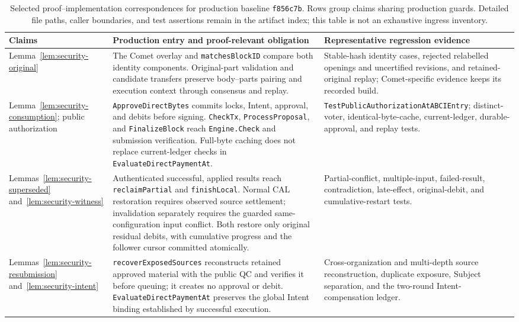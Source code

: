 \begin{table}[t]
\centering
\caption{Selected proof--implementation correspondences for production
baseline \texttt{f856c7b}. Rows group claims sharing production guards.
Detailed file paths, caller boundaries, and test assertions remain in
the artifact index; this table is not an exhaustive ingress inventory.}
\label{tab:proof-implementation}
\small
\setlength{\tabcolsep}{3pt}
\renewcommand{\arraystretch}{1.08}
\begin{tabular}{@{}p{}
                    p{}
                    p{}@{}}
\toprule
Claims &
Production entry and proof-relevant obligation &
Representative regression evidence \\
\midrule

Lemma~\ref{lem:security-original} &
The Comet overlay and \texttt{matchesBlockID} compare both identity
components. Original-part validation and candidate transfers preserve
body--parts pairing and execution context through consensus and replay. &
Stable-hash identity cases, rejected relabelled openings and uncertified
revisions, and retained-original replay; Comet-specific evidence keeps
its recorded build. \\

Lemma~\ref{lem:security-consumption};
public authorization &
\texttt{ApproveDirectBytes} commits locks, Intent, approval, and debits
before signing. \texttt{CheckTx}, \texttt{ProcessProposal}, and
\texttt{FinalizeBlock} reach \texttt{Engine.Check} and submission
verification. Full-byte caching does not replace current-ledger checks
in \texttt{EvaluateDirectPaymentAt}. &
\texttt{TestPublicAuthorization\allowbreak AtABCIEntry};
distinct-voter, identical-byte-cache, current-ledger, durable-approval,
and replay tests. \\

Lemmas~\ref{lem:security-superseded}
and~\ref{lem:security-witness} &
Authenticated successful, applied results reach
\texttt{reclaimPartial} and \texttt{finishLocal}.
Normal CAL restoration requires observed source settlement;
invalidation separately requires the guarded same-configuration input
conflict. Both restore only original residual debits, with cumulative
progress and the follower cursor committed atomically. &
Partial-conflict, multiple-input, failed-result, contradiction,
late-effect, original-debit, and cumulative-restart tests. \\

Lemmas~\ref{lem:security-resubmission}
and~\ref{lem:security-intent} &
\texttt{recoverExposedSources} reconstructs retained approved material
with the public QC and verifies it before queuing; it creates no
approval or debit. \texttt{EvaluateDirectPaymentAt} preserves the global
Intent binding established by successful execution. &
Cross-organization and multi-depth source reconstruction, duplicate
exposure, Subject separation, and the two-round Intent-compensation
ledger. \\


\end{tabular}
\end{table}

